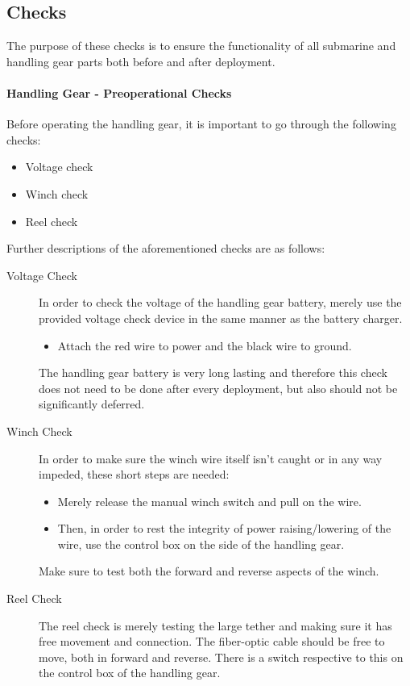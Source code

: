 \documentclass[
18pt, %
a4paper, %
oneside, %
headinclude,footinclude, %
]{scrartcl}
\begin{document}

\subsection{Checks}

The purpose of these checks is to ensure the functionality of all submarine and handling gear parts both before and after deployment.

\paragraph{Handling Gear - Preoperational Checks} Before operating the handling gear, it is important to go through the following checks:

\begin{itemize}[noitemsep] %
	\item Voltage check
	\item Winch check
	\item Reel check
	
\end{itemize}
Further descriptions of the aforementioned checks are as follows:

\begin{description}
	\item[Voltage Check] In order to check the voltage of the handling gear battery, merely use the provided voltage check device in the same manner as the battery charger.
	\begin{itemize}
		\item Attach the red wire to power and the black wire to ground.
	\end{itemize}  The handling gear battery is very long lasting and therefore this check does not need to be done after every deployment, but also should not be significantly deferred.
	\item[Winch Check] In order to make sure the winch wire itself isn't caught or in any way impeded, these short steps are needed:
	\begin{itemize}
		\item Merely release the manual winch switch and pull on the wire.
		\item Then, in order to rest the integrity of power raising/lowering of the wire, use the control box on the side of the handling gear.	
	\end{itemize}   Make sure to test both the forward and reverse aspects of the winch. 
	\item[Reel Check] The reel check is merely testing the large tether and making sure it has free movement and connection. The fiber-optic cable should be free to move, both in forward and reverse. There is a switch respective to this on the control box of the handling gear.
\end{description}
\end{document}

